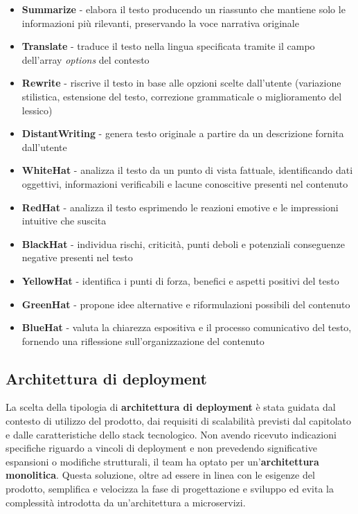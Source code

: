 \documentclass[a4paper,10pt]{article}
\begin{document}
\begin{itemize}
    \item \textbf{Summarize} - elabora il testo producendo un riassunto che mantiene solo le informazioni più rilevanti, preservando la voce narrativa originale
    \item \textbf{Translate} - traduce il testo nella lingua specificata tramite il campo dell'array \textit{options} del contesto
    \item \textbf{Rewrite} - riscrive il testo in base alle opzioni scelte dall'utente (variazione stilistica, estensione del testo, correzione grammaticale o miglioramento del lessico)
    \item \textbf{DistantWriting} - genera testo originale a partire da un descrizione fornita dall'utente
    \item \textbf{WhiteHat} - analizza il testo da un punto di vista fattuale, identificando dati oggettivi, informazioni verificabili e lacune conoscitive presenti nel contenuto
    \item \textbf{RedHat} - analizza il testo esprimendo le reazioni emotive e le impressioni intuitive che suscita
    \item \textbf{BlackHat} - individua rischi, criticità, punti deboli e potenziali conseguenze negative presenti nel testo
    \item \textbf{YellowHat} - identifica i punti di forza, benefici e aspetti positivi del testo
    \item \textbf{GreenHat} - propone idee alternative e riformulazioni possibili del contenuto
    \item \textbf{BlueHat} - valuta la chiarezza espositiva e il processo comunicativo del testo, fornendo una riflessione sull'organizzazione del contenuto
\end{itemize}

\subsection{Architettura di deployment}
La scelta della tipologia di \textbf{architettura di deployment} è stata guidata dal contesto di utilizzo del prodotto, dai requisiti di scalabilità previsti dal capitolato e dalle caratteristiche dello stack tecnologico.
Non avendo ricevuto indicazioni specifiche riguardo a vincoli di deployment e non prevedendo significative espansioni o modifiche strutturali, il team ha optato per un'\textbf{architettura monolitica}. Questa soluzione, oltre ad essere in linea con le esigenze del prodotto, semplifica e velocizza la fase di progettazione e sviluppo ed evita la complessità introdotta da un'architettura a microservizi.
\end{document}
